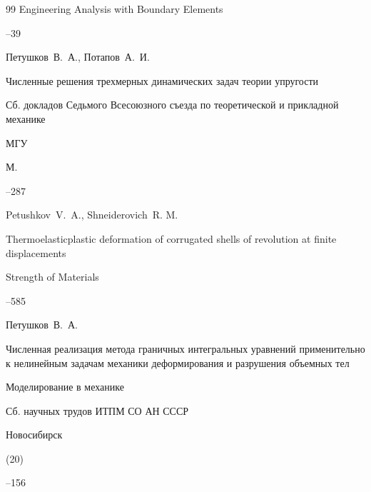 \begin{thebibliography}{99}
\jour  Engineering Analysis with Boundary Elements



--39





\by Петушков~В.~А., Потапов~А.~И.

\paper Численные решения трехмерных динамических задач теории упругости

\inbook Сб. докладов Седьмого Всесоюзного съезда по теоретической и прикладной механике

\publ МГУ

\publaddr М.


--287




\by Petushkov~V.~A., Shneiderovich~R. M.

\paper Thermoelasticplastic deformation of corrugated shells of revolution at finite displacements

\jour Strength of Materials




--585





\by Петушков~В.~А.

\paper Численная реализация метода граничных интегральных уравнений применительно к нелинейным задачам механики деформирования и разрушения объемных тел

\inbook  Моделирование в механике

\bookinfo Сб. научных трудов ИТПМ СО АН СССР

\publaddr Новосибирск


(20)


--156




\end{thebibliography}
